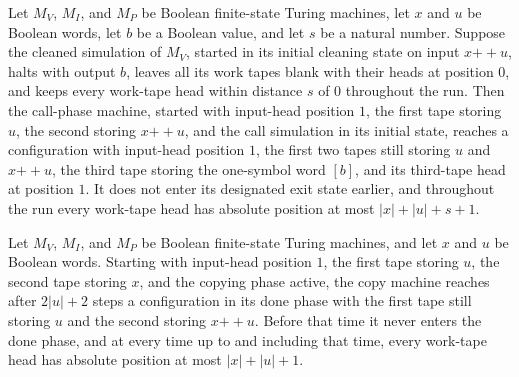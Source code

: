 \begin{theorem}
\label{Complexity.b2b_trial_call}
\leanok
{}
Let $M_V$, $M_I$, and $M_P$ be Boolean finite-state Turing machines, let $x$ and $u$ be
Boolean words, let $b$ be a Boolean value, and let $s$ be a natural number. Suppose the
cleaned simulation of $M_V$, started in its initial cleaning state on input
$x\mathbin{++}u$, halts with output $b$, leaves all its work tapes blank with their
heads at position $0$, and keeps every work-tape head within distance $s$ of $0$
throughout the run. Then the call-phase machine, started with input-head position $1$,
the first tape storing $u$, the second storing $x\mathbin{++}u$, and the call simulation
in its initial state, reaches a configuration with input-head position $1$, the first
two tapes still storing $u$ and $x\mathbin{++}u$, the third tape storing the one-symbol
word $[b]$, and its third-tape head at position $1$. It does not enter its designated
exit state earlier, and throughout the run every work-tape head has absolute position at
most $|x|+|u|+s+1$.
\end{theorem}

\begin{theorem}
\label{Complexity.b2b_trial_copy}
\leanok
{}
Let $M_V$, $M_I$, and $M_P$ be Boolean finite-state Turing machines, and let $x$ and $u$
be Boolean words. Starting with input-head position $1$, the first tape storing $u$, the
second tape storing $x$, and the copying phase active, the copy machine reaches after
$2|u|+2$ steps a configuration in its done phase with the first tape still storing $u$
and the second storing $x\mathbin{++}u$. Before that time it never enters the done
phase, and at every time up to and including that time, every work-tape head has
absolute position at most $|x|+|u|+1$.
\end{theorem}

